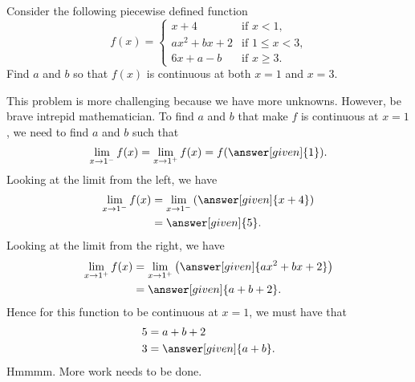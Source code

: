 \documentclass{ximera}
\begin{document}
\begin{example}
Consider the following piecewise defined function
\[
f(x) = 
\begin{cases}
  x+4 &\text{if $x<1$,}\\
  ax^2+bx+2 &\text{if $1\le x< 3$,}\\
  6x+a-b &\text{if $x\ge 3$.}
\end{cases}
\]
Find $a$ and $b$ so that $f(x)$ is continuous at both $x=1$ and $x=3$.
\begin{explanation}
This problem is more challenging because we have more
unknowns. However, be brave intrepid mathematician.  To find $a$ and
$b$ that make $f$ is continuous at $x=1$, we need to find $a$ and $b$
such that
\[
\lim_{x\to 1^-} f(x) = \lim_{x\to 1^+}f(x)=f(\answer[given]{1}).
\]
Looking at the limit from the left, we have
\begin{align*}
  \lim_{x\to 1^-} f(x) &= \lim_{x\to 1^-} \left(\answer[given]{x+4}\right) \\
  &=\answer[given]{5}.
\end{align*}
Looking at the limit from the right, we have
\begin{align*}
  \lim_{x\to 1^+} f(x) &= \lim_{x\to 1^+} \left(\answer[given]{ax^2+bx+2}\right) \\
  &= \answer[given]{a+b+2}.
\end{align*}
Hence for this function to be continuous at $x=1$, we must have that
\begin{align*}
  5 &= a+b+2\\
  3 &= \answer[given]{a+b}.\\
\end{align*}
Hmmmm. More work needs to be done.


\end{explanation}
\end{example}
\end{document}
